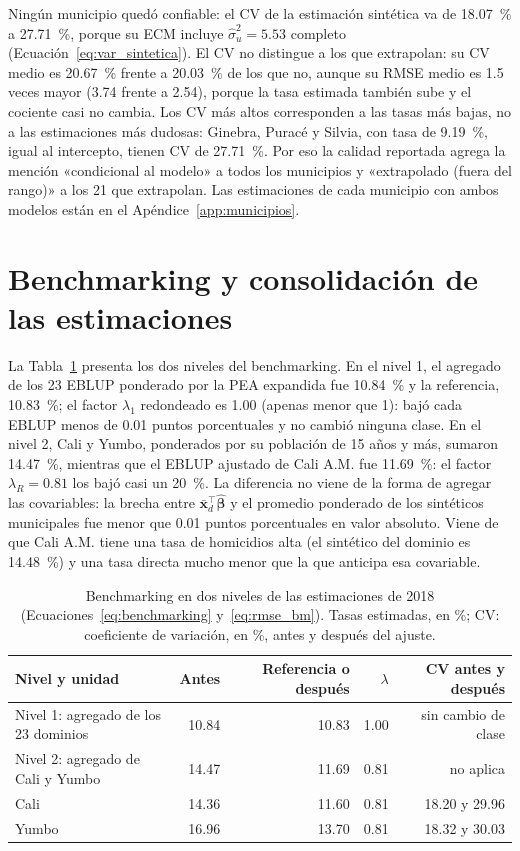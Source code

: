 Ningún municipio quedó confiable: el CV de la estimación sintética va de 18.07~\% a 27.71~\%, porque su ECM incluye $\hat{\sigma}_u^2 = 5.53$ completo (Ecuación~\ref{eq:var_sintetica}). El CV no distingue a los que extrapolan: su CV medio es 20.67~\% frente a 20.03~\% de los que no, aunque su RMSE medio es 1.5 veces mayor (3.74 frente a 2.54), porque la tasa estimada también sube y el cociente casi no cambia. Los CV más altos corresponden a las tasas más bajas, no a las estimaciones más dudosas: Ginebra, Puracé y Silvia, con tasa de 9.19~\%, igual al intercepto, tienen CV de 27.71~\%. Por eso la calidad reportada agrega la mención «condicional al modelo» a todos los municipios y «extrapolado (fuera del rango)» a los 21 que extrapolan. Las estimaciones de cada municipio con ambos modelos están en el Apéndice~\ref{app:municipios}.

\section{Benchmarking y consolidación de las estimaciones}
\label{sec:res_benchmarking}

La Tabla~\ref{tab:res_benchmarking} presenta los dos niveles del benchmarking. En el nivel 1, el agregado de los 23 EBLUP ponderado por la PEA expandida fue 10.84~\% y la referencia, 10.83~\%; el factor $\lambda_1$ redondeado es 1.00 (apenas menor que 1): bajó cada EBLUP menos de 0.01 puntos porcentuales y no cambió ninguna clase. En el nivel 2, Cali y Yumbo, ponderados por su población de 15 años y más, sumaron 14.47~\%, mientras que el EBLUP ajustado de Cali A.M. fue 11.69~\%: el factor $\lambda_R = 0.81$ los bajó casi un 20~\%. La diferencia no viene de la forma de agregar las covariables: la brecha entre $\bar{\mathbf{x}}_d^\top\hat{\boldsymbol{\beta}}$ y el promedio ponderado de los sintéticos municipales fue menor que 0.01 puntos porcentuales en valor absoluto. Viene de que Cali A.M. tiene una tasa de homicidios alta (el sintético del dominio es 14.48~\%) y una tasa directa mucho menor que la que anticipa esa covariable.

\begin{table}[!htbp]
\centering
\small
\caption{Benchmarking en dos niveles de las estimaciones de 2018 (Ecuaciones~\ref{eq:benchmarking} y~\ref{eq:rmse_bm}). Tasas estimadas, en \%; CV: coeficiente de variación, en \%, antes y después del ajuste.}
\label{tab:res_benchmarking}
\begin{tabularx}{\linewidth}{>{\raggedright\arraybackslash}X r r r r}
\toprule
Nivel y unidad & Antes & Referencia o después & $\lambda$ & CV antes y después \\
\midrule
Nivel 1: agregado de los 23 dominios & 10.84 & 10.83 & 1.00 & sin cambio de clase \\
Nivel 2: agregado de Cali y Yumbo & 14.47 & 11.69 & 0.81 & no aplica \\
\quad Cali & 14.36 & 11.60 & 0.81 & 18.20 y 29.96 \\
\quad Yumbo & 16.96 & 13.70 & 0.81 & 18.32 y 30.03 \\
\bottomrule
\end{tabularx}
\end{table}

